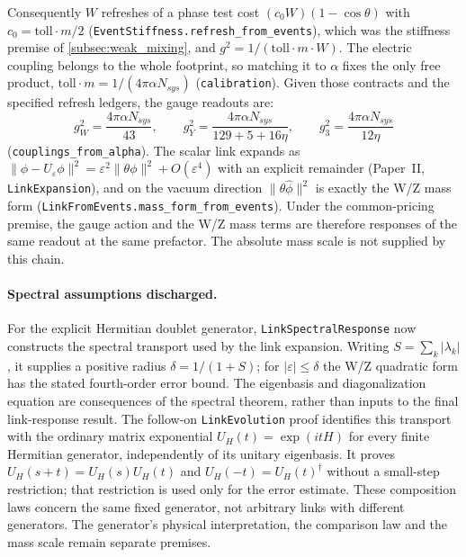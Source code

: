 Consequently $W$ refreshes of a phase test cost $(c_0W)(1-\cos\theta)$ with $c_0=\mathrm{toll}\cdot m/2$ (\texttt{EventStiffness.refresh\_from\_events}), which was the stiffness premise of \cref{subsec:weak_mixing}, and $g^2=1/(\mathrm{toll}\cdot m\cdot W)$. The electric coupling belongs to the whole footprint, so matching it to $\alpha$ fixes the only free product, $\mathrm{toll}\cdot m=1/(4\pi\alpha N_{sys})$ (\texttt{calibration}). Given those contracts and the specified refresh ledgers, the gauge readouts are:
\begin{equation}
g_W^2=\frac{4\pi\alpha N_{sys}}{43},\qquad g_Y^2=\frac{4\pi\alpha N_{sys}}{129+5+16\eta},\qquad g_3^2=\frac{4\pi\alpha N_{sys}}{12\eta}
\end{equation}
(\texttt{couplings\_from\_alpha}). The scalar link expands as $\|\phi-U_\varepsilon\phi\|^2=\varepsilon^2\|\theta\phi\|^2+O(\varepsilon^4)$ with an explicit remainder (Paper~II, \texttt{LinkExpansion}), and on the vacuum direction $\|\theta\hat\phi\|^2$ is exactly the W/Z mass form (\texttt{LinkFromEvents.mass\_form\_from\_events}). Under the common-pricing premise, the gauge action and the W/Z mass terms are therefore responses of the same readout at the same prefactor. The absolute mass scale is not supplied by this chain.

\paragraph{Spectral assumptions discharged.} For the explicit Hermitian doublet generator, \texttt{LinkSpectralResponse} now constructs the spectral transport used by the link expansion. Writing $S=\sum_k|\lambda_k|$, it supplies a positive radius $\delta=1/(1+S)$; for $|\varepsilon|\le\delta$ the W/Z quadratic form has the stated fourth-order error bound. The eigenbasis and diagonalization equation are consequences of the spectral theorem, rather than inputs to the final link-response result. The follow-on \texttt{LinkEvolution} proof identifies this transport with the ordinary matrix exponential $U_H(t)=\exp(itH)$ for every finite Hermitian generator, independently of its unitary eigenbasis. It proves $U_H(s+t)=U_H(s)U_H(t)$ and $U_H(-t)=U_H(t)^\dagger$ without a small-step restriction; that restriction is used only for the error estimate. These composition laws concern the same fixed generator, not arbitrary links with different generators. The generator's physical interpretation, the comparison law and the mass scale remain separate premises.

